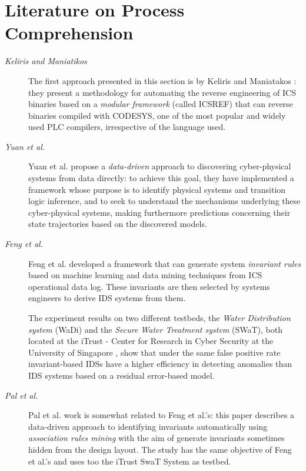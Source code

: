 \section{Literature on Process Comprehension}
\label{sec:related_work}
\begin{description}
	\item[\textit{Keliris and Maniatikos}] The first approach presented in this section is by Keliris and Maniatakos \cite{keliris_maniatakos}: they present a methodology for automating the reverse engineering of ICS binaries based on a \textit{modular framework} (called ICSREF) that can reverse binaries compiled with CODESYS, one of the most popular and widely used PLC compilers, irrespective of the language used.
	
	\item[\textit{Yuan et al.}] Yuan et al. \cite{yuan_et_al} propose a \textit{data-driven} approach to discovering cyber-physical systems from data directly: to achieve this goal, they have implemented a framework whose purpose is to identify physical systems and transition logic inference, and to seek to understand the mechanisms underlying these cyber-physical systems, making furthermore predictions concerning their state trajectories based on the discovered models.
	
	\item[\textit{Feng et al.}] Feng et al. \cite{feng_swat} developed a framework that can generate system \textit{invariant rules} based on machine learning and data mining techniques from ICS operational data log. These invariants are then selected by systems engineers to derive IDS systems from them.
	
	The experiment results on two different testbeds, the \textit{Water Distribution system} (WaDi) and the \textit{Secure Water Treatment system} (SWaT), both located at the iTrust - Center for Research in Cyber Security at the University of Singapore \cite{itrust_site}, show that under the same false positive rate invariant-based IDSs have a higher efficiency in detecting anomalies than IDS systems based on a residual error-based model. 
	
	\item[\textit{Pal et al.}] Pal et al. \cite{pal_et_al} work is somewhat related to Feng et al.'s: this paper describes a data-driven approach to identifying invariants automatically using \textit{association rules mining} \cite{association_rules_mining} with the aim of generate invariants sometimes hidden from the design layout. The study has the same objective of Feng et al.'s and uses too the iTrust SwaT System as testbed.
	

\end{description}
